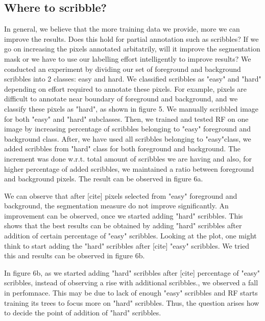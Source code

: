 \subsection{Where to scribble?}
In general, we believe that the more training data we provide, more we can improve the results. Does this hold for partial annotation such as scribbles? If we go on increasing the pixels annotated arbitatrily, will it improve the segmentation mask or we have to use our labelling effort intelligently to improve results? We conducted an experiment by dividing our set of foreground and background scribbles into 2 classes: easy and hard. We classified scribbles as "easy" and "hard" depending on effort required to annotate these pixels. For example, pixels are difficult to annotate near boundary of foreground and background, and we classify these pixels as "hard", as shown in figure 5. We manually scribbled image for both "easy" and "hard" subclasses. Then, we trained and tested RF on one image by increasing percentage of scribbles belonging to "easy" foreground and background class. After, we have used all scribbles belonging to "easy"class, we added scribbles from "hard" class for both foreground and background. The increment was done w.r.t. total amount of scribbles we are having and also, for higher percentage of added scribbles, we maintained a ratio between foreground and background pixels. The result can be observed in figure 6a. \par

We can observe that after [cite] pixels selected from "easy" foreground and background, the segmentation measure do not improve significantly. An improvement can be observed, once we started adding "hard" scribbles. This shows that the best results can be obtained by adding "hard" scribbles after addition of certain percentage of "easy" scribbles. Looking at the plot, one might think to start adding the "hard" scribbles after [cite] "easy" scribbles. We tried this and results can be observed in figure 6b. \par

In figure 6b, as we started adding "hard" scribbles after [cite] percentage of "easy" scribbles, instead of observing a rise with additional scribbles., we observed a fall in perfomnace. This may be due to lack of enough "easy" scribbles and RF starts training its trees to focus more on "hard" scribbles. Thus, the question arises how to decide the point of addition of "hard" scribbles.

